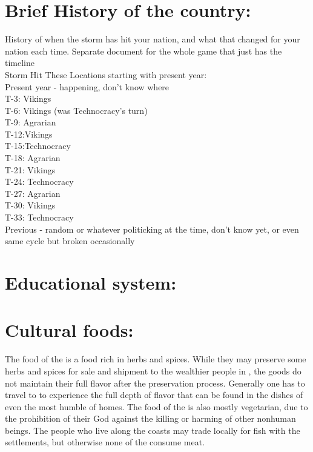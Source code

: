 \documentclass[blue]{GL2020}
\begin{document}
\section{Brief History of the country:}

History of when the storm has hit your nation, and what that changed for your nation each time.
Separate document for the whole game that just has the timeline\\

Storm Hit These Locations starting with present year:\\
Present year - happening, don’t know where\\
T-3: Vikings\\
T-6: Vikings (was Technocracy’s turn)\\
T-9: Agrarian\\
T-12:Vikings\\
T-15:Technocracy\\
T-18: Agrarian\\
T-21: Vikings\\
T-24: Technocracy\\
T-27: Agrarian\\
T-30: Vikings\\
T-33: Technocracy\\
Previous - random or whatever politicking at the time, don’t know yet, or even same cycle but broken occasionally\\

\section{Educational system:}

\section{Cultural foods:}

The food of the \pSunCh{} is a food rich in herbs and spices.  While they may preserve some herbs and spices for sale and shipment to the wealthier people in \pCreators{}, the goods do not maintain their full flavor after the preservation process.  Generally one has to travel to \pSun{} to experience the full depth of flavor that can be found in the dishes of even the most humble of homes.  The food of the \pSunCh{} is also mostly vegetarian, due to the prohibition of their God against the killing or harming of other nonhuman beings.  The people who live along the coasts may trade locally for fish with the \pViking{} settlements, but otherwise none of the \pSunCh{} consume meat.
\end{document}
